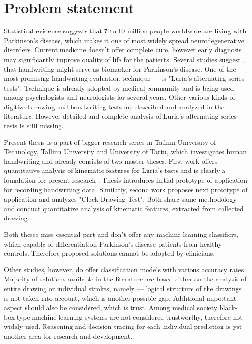 \section{Problem statement}

Statistical evidence suggests that 7 to 10 million people worldwide are living with Parkinson’s disease, which makes it one of most widely spread neurodegenerative disorders. Current medicine doesn't offer complete cure, however early diagnosis may significantly improve quality of life for the patients. Several studies suggest \cite{drotar2016evaluation, drotar2015decision, rosenblum2013handwriting}, that handwriting might serve as biomarker for Parkinson’s disease.  One of the most promising handwriting evaluation technique --- is "Luria’s alternating series tests". Technique is already adopted by medical community and is being used among psychologists and neurologists for several years. Other various kinds of digitized drawing and handwriting tests are described and analyzed in the literature. However detailed and complete analysis of Luria's alternating series tests is still missing.

Present thesis is a part of bigger research series in Tallinn University of Technology, Tallinn University and University of Tartu, which investigates human handwriting and already consists of two master theses. First work offers quantitative analysis of kinematic features for Luria's tests and is clearly a foundation for present research \cite{kozhenkina2016luria}. Thesis introduces initial prototype of application for recording handwriting data. Similarly, second work \cite{masarov2017clock} proposes next prototype of application and analyzes "Clock Drawing Test". Both share same methodology and conduct quantitative analysis of kinematic features, extracted from collected drawings. 

Both theses miss essential part and don't offer any machine learning classifiers, which capable of differentiation Parkinson's disease patients from healthy controls. Therefore proposed solutions cannot be adopted by clinicians. 

Other studies, however, do offer classification models \cite{drotar2016evaluation, san2016digitized, pereira2016deep, aghanavesi2017smartphone} with various accuracy rates. Majority of solutions available in the literature are based either on the analysis of entire drawing or individual strokes, namely --- logical structure of the drawings is not taken into account, which is another possible gap. Additional important aspect should also be considered, which is trust. Among medical society black-box type machine learning systems are not considered trustworthy, therefore not widely used. Reasoning and decision tracing for each individual prediction is yet another area for research and development.

